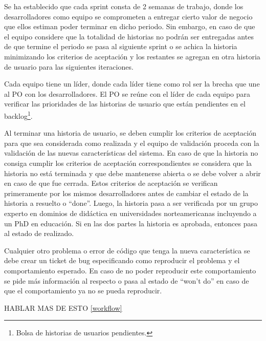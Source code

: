 Se ha establecido que cada sprint consta de 2 semanas de trabajo, donde los desarrolladores como equipo se comprometen a entregar cierto valor de negocio que ellos estiman poder terminar en dicho periodo. Sin embargo, en caso de que el equipo considere que la totalidad de historias no podrán ser entregadas antes de que termine el periodo se pasa al siguiente sprint o se achica la historia minimizando los criterios de aceptación y los restantes se agregan en otra historia de usuario para las siguientes iteraciones.

Cada equipo tiene un líder, donde cada líder tiene como rol ser la brecha que une al PO con los desarrolladores. El PO se reúne con el líder de cada equipo para verificar las prioridades de las historias de usuario que están pendientes en el backlog\footnote{Bolsa de historias de usuarios pendientes.}. 

Al terminar una historia de usuario, se deben cumplir los criterios de aceptación para que sea considerada como realizada y el equipo de validación proceda con la validación de las nuevas características del sistema. En caso de que la historia no consiga cumplir los criterios de aceptación correspondientes se considera que la historia no está terminada y que debe mantenerse abierta o se debe volver a abrir en caso de que fue cerrada. Estos criterios de aceptación se verifican primeramente por los mismos desarrolladores antes de cambiar el estado de la historia a resuelto o “done”. Luego, la historia pasa a ser verificada por un grupo experto en dominios de didáctica en universidades norteamericanas incluyendo a un PhD en educación. Si en las dos partes la historia es aprobada, entonces pasa al estado de realizado. 

Cualquier otro problema o error de código que tenga la nueva característica se debe crear un ticket de bug especificando como reproducir el problema y el comportamiento esperado. En caso de no poder reproducir este comportamiento se pide más información al respecto o pasa al estado de “won’t do” en caso de que el comportamiento ya no se pueda reproducir.

HABLAR MAS DE ESTO \ref{workflow}


